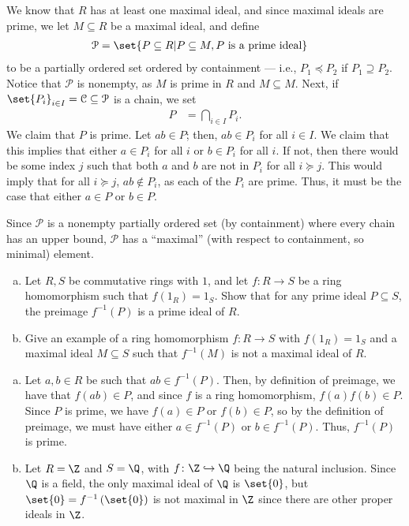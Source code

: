 \documentclass[10pt]{mypackage}
\begin{document}
\begin{solution}
  We know that $R$ has at least one maximal ideal, and since maximal ideals are prime, we let $M\subseteq R$ be a maximal ideal, and define
  \begin{align*}
    \mathcal{P} &= \set{P\subseteq R | P\subseteq M, P\text{ is a prime ideal}}
  \end{align*}
  to be a partially ordered set ordered by containment --- i.e., $P_1\preceq P_2$ if $P_1\supseteq P_2$. Notice that $\mathcal{P}$ is nonempty, as $M$ is prime in $R$ and $M\subseteq M$. Next, if $\set{P_i}_{i\in I} = \mathcal{C}\subseteq \mathcal{P}$ is a chain, we set
  \begin{align*}
    P &= \bigcap_{i\in I}P_i.
  \end{align*}
  We claim that $P$ is prime. Let $ab\in P$; then, $ab\in P_i$ for all $i\in I$. We claim that this implies that either $a\in P_i$ for all $i$ or $b\in P_i$ for all $i$. If not, then there would be some index $j$ such that both $a$ and $b$ are not in $P_i$ for all $i\succeq j$. This would imply that for all $i\succeq j$, $ab\notin P_i$, as each of the $P_i$ are prime. Thus, it must be the case that either $a\in P$ or $b\in P$.\newline

  Since $\mathcal{P}$ is a nonempty partially ordered set (by containment) where every chain has an upper bound, $\mathcal{P}$ has a ``maximal'' (with respect to containment, so minimal) element.
\end{solution}
\begin{problem}[Problem 4]\hfill
  \begin{enumerate}[(a)]
    \item Let $R,S$ be commutative rings with $1$, and let $f\colon R\rightarrow S$ be a ring homomorphism such that $f\left( 1_R \right) = 1_S$. Show that for any prime ideal $ P\subseteq S $, the preimage $f^{-1}\left( P \right)$ is a prime ideal of $R$.
    \item Give an example of a ring homomorphism $f\colon R\rightarrow S$ with $f\left( 1_{R} \right) = 1_S$ and a maximal ideal $M\subseteq S$ such that $f^{-1}\left( M \right)$ is not a maximal ideal of $R$.
  \end{enumerate}
\end{problem}
\begin{solution}\hfill
  \begin{enumerate}[(a)]
    \item Let $a,b\in R$ be such that $ab\in f^{-1}\left( P \right)$. Then, by definition of preimage, we have that $f(ab)\in P$, and since $f$ is a ring homomorphism, $f(a)f(b)\in P$. Since $P$ is prime, we have $f(a)\in P$ or $f(b)\in P$, so by the definition of preimage, we must have either $a\in f^{-1}\left( P \right)$ or $b\in f^{-1}\left( P \right)$. Thus, $f^{-1}\left( P \right)$ is prime.
    \item Let $R = \Z$ and $S = \Q$, with $f\colon \Z\hookrightarrow \Q$ being the natural inclusion. Since $\Q$ is a field, the only maximal ideal of $\Q$ is $\set{0}$, but $\set{0} = f^{-1}\left( \set{0} \right)$ is not maximal in $\Z$ since there are other proper ideals in $\Z$.
  \end{enumerate}
\end{solution}
\end{document}
